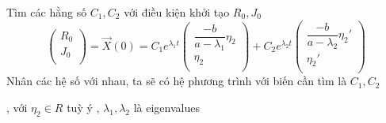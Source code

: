 \documentclass[a4paper]{article}
\begin{document}
    \begin{center}
    \end{center}
    Tìm các hằng số $C_1, C_2$ với điều kiện khởi tạo $R_0, J_0$
    \begin{equation*}
        \begin{pmatrix}
            R_0 \\
            J_0 \\
        \end{pmatrix}
        =
        \vec{X}(0)
        =
        {C_1}e^{\lambda_1 t}
            \begin{pmatrix}
                \dfrac{-b}{a-\lambda_1}\eta_2 \\
                \eta_2 \\
            \end{pmatrix}
        +
        {C_2}e^{\lambda_2 t}
            \begin{pmatrix}
                \dfrac{-b}{a-\lambda_2}\eta_2' \\
                \eta_2' \\
            \end{pmatrix}
    \end{equation*}
    Nhân các hệ số với nhau, ta sẽ có hệ phương trình với biến cần tìm là $C_1, C_2$
    \begin{center}
        , với $\eta_2 \in R$ tuỳ ý
        , $\lambda_1, \lambda_2$ là eigenvalues
    \end{center}
\end{document}

